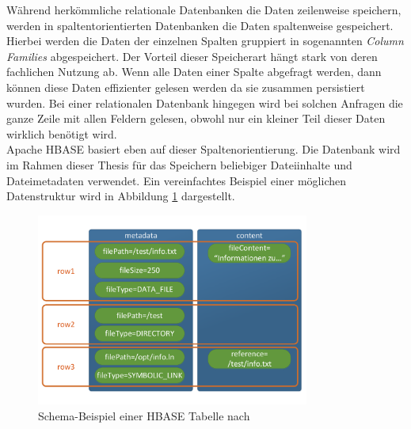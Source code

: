 \noindent
Während herkömmliche relationale Datenbanken die Daten zeilenweise speichern, werden in spaltentorientierten Datenbanken die Daten spaltenweise gespeichert. Hierbei werden die Daten der einzelnen Spalten gruppiert in sogenannten \textit{Column Families} abgespeichert. Der Vorteil dieser Speicherart hängt stark von deren fachlichen Nutzung ab. Wenn alle Daten einer Spalte abgefragt werden, dann können diese Daten effizienter gelesen werden da sie zusammen persistiert wurden. Bei einer relationalen Datenbank hingegen wird bei solchen Anfragen die ganze Zeile mit allen Feldern gelesen, obwohl nur ein kleiner Teil dieser Daten wirklich benötigt wird.\\

\noindent
Apache HBASE basiert eben auf dieser Spaltenorientierung. Die Datenbank wird im Rahmen dieser Thesis für das Speichern beliebiger Dateiinhalte und Dateimetadaten verwendet. Ein vereinfachtes Beispiel einer möglichen Datenstruktur wird in Abbildung \ref{fig:hbase_schema_example} dargestellt.\\

\begin{figure}[ht]
  \centering
  \includegraphics[width=0.8\textwidth]{./resource/hbase_data_schema_example.pdf}
  \caption{Schema-Beispiel einer HBASE Tabelle nach \cite{big_data_praxis}}
  \label{fig:hbase_schema_example}
\end{figure}

